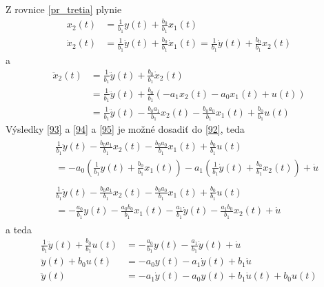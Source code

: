 \documentclass[a4paper, 10pt, ]{article}
\begin{document}
Z rovnice \eqref{pr_tretia} plynie
\begin{align}
    x_2(t) &= \frac{1}{b_1} y(t)  + \frac{b_0}{b_1}  x_1(t) \label{93} \\
    \dot x_2(t) &= \frac{1}{b_1} \dot y(t)  + \frac{b_0}{b_1}  \dot x_1(t) = \frac{1}{b_1} \dot y(t) + \frac{b_0}{b_1}  x_2(t)  \label{94}
\end{align}
a
\begin{subequations} \label{95}
    \begin{align}
        \ddot x_2(t) &= \frac{1}{b_1} \ddot y(t) + \frac{b_0}{b_1} \dot x_2(t) \\
        &= \frac{1}{b_1} \ddot y(t) + \frac{b_0}{b_1} \left( - a_1 x_2(t) - a_0 x_1(t) + u(t) \right) \\
        &= \frac{1}{b_1} \ddot y(t) - \frac{b_0 a_1}{b_1} x_2(t) - \frac{b_0 a_0}{b_1} x_1(t) + \frac{b_0}{b_1} u(t)
    \end{align} 
\end{subequations}
Výsledky \eqref{93} a \eqref{94} a \eqref{95} je možné dosadiť do \eqref{92}, teda
\begin{align}
    &
    \begin{aligned}
    & 
    \frac{1}{b_1} \ddot y(t) - \frac{b_0 a_1}{b_1} x_2(t) - \frac{b_0 a_0}{b_1} x_1(t) + \frac{b_0}{b_1} u(t) 
    \\&
    = - a_0 \left( \frac{1}{b_1} y(t)  + \frac{b_0}{b_1}  x_1(t) \right) - a_1 \left( \frac{1}{b_1} \dot y(t) + \frac{b_0}{b_1}  x_2(t) \right) + \dot u 
    \end{aligned} \\
    &
    \begin{aligned}
    &
    \frac{1}{b_1} \ddot y(t) - \frac{b_0 a_1}{b_1} x_2(t) - \frac{b_0 a_0}{b_1} x_1(t) + \frac{b_0}{b_1} u(t)
    \\&
    = -  \frac{a_0}{b_1}  y(t) -  \frac{ a_0 b_0}{b_1}  x_1(t) -  \frac{a_1}{b_1} \dot y(t) -  \frac{a_1 b_0}{b_1}  x_2(t) + \dot u
    \end{aligned}
\end{align}
a teda
\begin{align}
    \frac{1}{b_1} \ddot y(t)  + \frac{b_0}{b_1} u(t) &= -  \frac{a_0}{b_1}  y(t)  -  \frac{a_1}{b_1} \dot y(t)  + \dot u \\
    \ddot y(t)  + b_0 u(t) &= -  a_0 y(t)  -  a_1 \dot y(t)  + b_1 \dot u \\
    \ddot y(t)  &= -  a_1 \dot y(t)  -  a_0 y(t)  + b_1 \dot u(t) + b_0 u(t)
\end{align}
\end{document}
